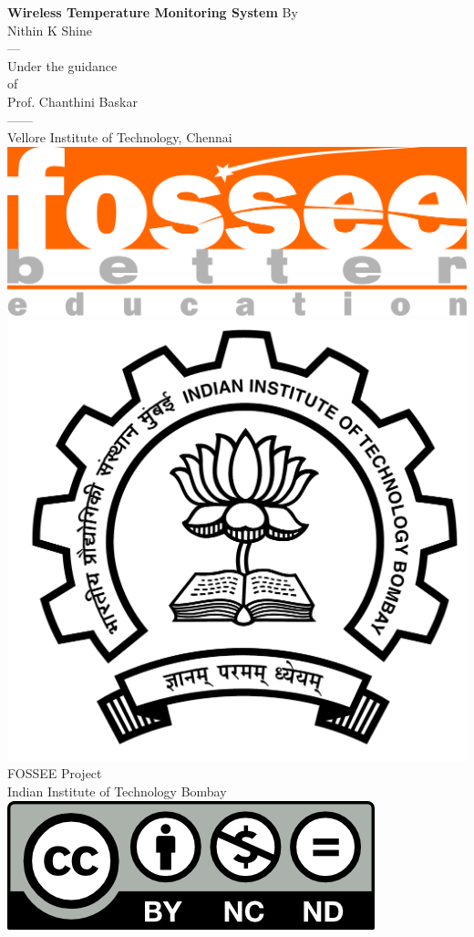 \begin{center}
    {\bf {\Huge Wireless Temperature Monitoring System}}
    \vfill
    By\\ Nithin K Shine \\
     ---\\
    Under the guidance\\ of\\Prof. Chanthini Baskar \\
     ------\\
     Vellore Institute of Technology, Chennai\\
    \vfill
    \includegraphics[width=0.3\linewidth]{suppl/fossee_logo_hi.png} \quad
    \includegraphics[width=0.2\linewidth]{suppl/IITB-logo-HighRes.png} \\
    FOSSEE Project \\
    Indian Institute of Technology Bombay \\ [2mm]
    \includegraphics[width=0.15\linewidth]{suppl/by-nc-nd.png} \\ [1mm]
\end{center}

\clearpage
